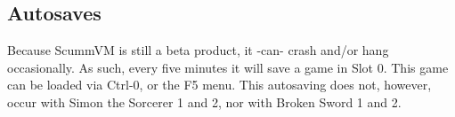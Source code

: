 \subsection {Autosaves}
Because ScummVM is still a beta product, it -can- crash and/or hang
occasionally. As such, every five minutes it will save a game in Slot 0. This
game can be loaded via Ctrl-0, or the F5 menu. This autosaving does not, 
however, occur with Simon the Sorcerer 1 and 2, nor with Broken Sword 1 and 2.
